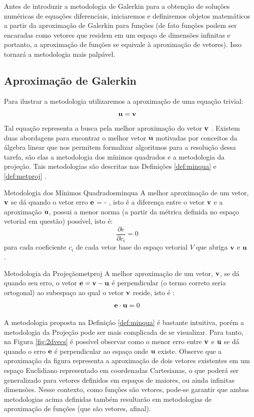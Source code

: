   Antes de introduzir a metodologia de Galerkin para a obtenção de soluções numéricas de equações diferenciais, iniciaremos e definiremos objetos matemáticos a partir da aproximação de Galerkin para funções (de fato funções podem ser encaradas como vetores que residem em um espaço de dimensões infinitas e portanto, a aproximação de funções se equivale à aproximação de vetores). Isso tornará a metodologia mais palpável.

  \subsection{Aproximação de Galerkin}
  Para ilustrar a metodologia utilizaremos a aproximação de uma equação trivial: 
  \begin{equation}
  \bm{\mathrm{u}} = \bm{\mathrm{v}} 
  \end{equation}
    Tal equação representa a busca pela melhor aproximação do vetor $\bm{\mathrm{v}}$ . Existem duas abordagens para encontrar o melhor vetor $\bm{\mathrm{u}}$ motivadas por conceitos da álgebra linear que nos permitem formalizar algoritmos para a resolução dessa tarefa, são elas a metodologia dos mínimos quadrados e a metodologia da projeção. Tais metodologias são descritas nas Definições \ref{def:minqua} e \ref{def:metproj} .

  \begin{Definition}{Metodologia dos Mínimos Quadrados}{minqua}
  A melhor aproximação de um vetor, $\bm{\mathrm{v}}$ se dá quando o vetor erro $\bm{\mathrm{e}}$ = \vvec - \uvec, isto é a diferença entre o vetor $\bm{\mathrm{v}}$ e a aproximação $\bm{\mathrm{u}}$, possui a menor norma (a partir da métrica definida no espaço vetorial em questão) possível, isto é: $$\frac{\partial e}{\partial c_i} = 0 $$ para cada coeficiente $c_i$ de cada vetor base do espaço vetorial $V$ que abriga  $\bm{\mathrm{v}}$  e  $\bm{\mathrm{u}}$ .
  \end{Definition}

  \begin{Definition}{Metodologia da Projeção}{metproj}
  A melhor aproximação de um vetor, $\bm{\mathrm{v}}$, se dá quando seu erro, o vetor $\bm{\mathrm{e}} =
  \bm{\mathrm{v}} - \bm{\mathrm{u}}$ é perpendicular (o termo correto seria ortogonal) ao subespaço ao qual o vetor $\bm{\mathrm{v}}$ reside, isto é :$$ \bm{\mathrm{e}} \cdot \bm{\mathrm{u}} = 0 $$
  \end{Definition}
  
  A metodologia proposta na Definição \ref{def:minqua} é bastante intuitiva,
  porém a metodologia da Projeção pode ser mais complicada de se visualizar.
  Para tanto,  na Figura \ref{fig:2dvecs} é possível observar como o menor erro entre  $\bm{\mathrm{v}}$  e  $\bm{\mathrm{u}}$ se dá quando o erro  $\bm{\mathrm{e}}$  é perpendicular ao espaço onde  $\bm{\mathrm{u}}$ existe.  Observe que a aproximação da figura representa a aproximação de dois vetores existentes em um espaço Euclidiano representado em coordenadas Cartesianas, o  que poderá ser generalizado para vetores definidos em espaços de maiores, ou ainda infinitas dimensões. Nesse contexto, como funções são vetores, pode-se garantir que ambas metodologias acima definidas também resultarão em  metodologias de aproximação de funções (que são vetores, afinal).

